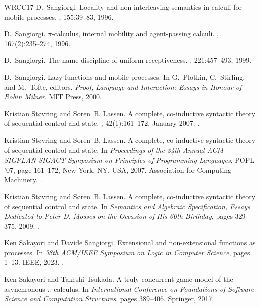 \documentclass[11pt,a4paper]{amsart}
\theoremstyle{plain}
\theoremstyle{definition}
\theoremstyle{defC}
\theoremstyle{thmC}
\theoremstyle{plain}
\numberwithin{equation}{section}
\theoremstyle{plain}
\theoremstyle{definition}
\begin{document}
\begin{thebibliography}{WRCC17}
D.~Sangiorgi.
\newblock Locality and non-interleaving semantics in calculi for mobile
  processes.
, 155:39--83, 1996.

D.~Sangiorgi.
\newblock $\pi$-calculus, internal mobility and agent-passing calculi.
, 167(2):235--274, 1996.

D.~Sangiorgi.
\newblock The name discipline of uniform receptiveness.
, 221:457--493, 1999.

D.~Sangiorgi.
\newblock Lazy functions and mobile processes.
\newblock In G.~Plotkin, C.~Stirling, and M.~Tofte, editors, {\em Proof,
  Language and Interaction: Essays in Honour of Robin Milner}. {MIT} {P}ress,
  2000.

Kristian St\o{}vring and Soren~B. Lassen.
\newblock A complete, co-inductive syntactic theory of sequential control and
  state.
, 42(1):161–172, January 2007.
\newblock \href {https://doi.org/10.1145/1190215.1190244}
  {}.

Kristian St\o{}vring and Soren~B. Lassen.
\newblock A complete, co-inductive syntactic theory of sequential control and
  state.
\newblock In {\em Proceedings of the 34th Annual ACM SIGPLAN-SIGACT Symposium
  on Principles of Programming Languages}, POPL ’07, page 161–172, New
  York, NY, USA, 2007. Association for Computing Machinery.
\newblock \href {https://doi.org/10.1145/1190216.1190244}
  {}.

Kristian St{\o}vring and S{\o}ren~B. Lassen.
\newblock A complete, co-inductive syntactic theory of sequential control and
  state.
\newblock In {\em Semantics and Algebraic Specification, Essays Dedicated to
  Peter D. Mosses on the Occasion of His 60th Birthday}, pages 329--375, 2009.
\newblock \href {https://doi.org/10.1007/978-3-642-04164-8_17}
  {}.

Ken Sakayori and Davide Sangiorgi.
\newblock Extensional and non-extensional functions as processes.
\newblock In {\em 38th {ACM/IEEE} Symposium on Logic in Computer Science},
  pages 1--13. {IEEE}, 2023.
\newblock \href {https://doi.org/10.1109/LICS56636.2023.10175686}
  {}.

Ken Sakayori and Takeshi Tsukada.
\newblock A truly concurrent game model of the asynchronous $\pi$-calculus.
\newblock In {\em International Conference on Foundations of Software Science
  and Computation Structures}, pages 389--406. Springer, 2017.


\end{thebibliography}
\end{document}
